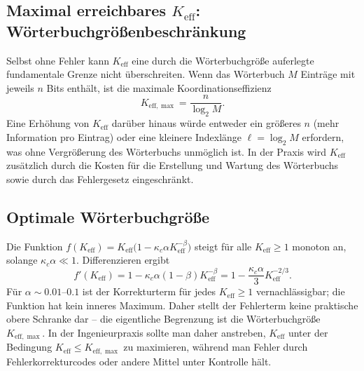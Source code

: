\documentclass[12pt,a4paper]{article}
\theoremstyle{remark}
\newcommand{\Keff}{K_{\mathrm{eff}}}
\newcommand{\Keffmax}{K_{\mathrm{eff},\max}}
\begin{document}
	\subsection{Maximal erreichbares $\Keff$: Wörterbuchgrößenbeschränkung}
	
	Selbst ohne Fehler kann $\Keff$ eine durch die Wörterbuchgröße auferlegte fundamentale Grenze nicht überschreiten. Wenn das Wörterbuch $M$ Einträge mit jeweils $n$ Bits enthält, ist die maximale Koordinationseffizienz
	\begin{equation}
		\Keffmax = \frac{n}{\log_2 M}. \label{eq:keff-max}
	\end{equation}
	Eine Erhöhung von $\Keff$ darüber hinaus würde entweder ein größeres $n$ (mehr Information pro Eintrag) oder eine kleinere Indexlänge $\ell = \log_2 M$ erfordern, was ohne Vergrößerung des Wörterbuchs unmöglich ist. In der Praxis wird $\Keff$ zusätzlich durch die Kosten für die Erstellung und Wartung des Wörterbuchs sowie durch das Fehlergesetz eingeschränkt.
	
	\subsection{Optimale Wörterbuchgröße}
	
	Die Funktion $f(\Keff) = \Keff \bigl(1 - \kappa_c \alpha K_{\mathrm{eff}}^{-\beta}\bigr)$ steigt für alle $\Keff \ge 1$ monoton an, solange $\kappa_c\alpha \ll 1$. Differenzieren ergibt
	\[
	f'(\Keff) = 1 - \kappa_c\alpha(1-\beta)K_{\mathrm{eff}}^{-\beta} = 1 - \frac{\kappa_c\alpha}{3} K_{\mathrm{eff}}^{-2/3}.
	\]
	Für $\alpha \sim 0.01$–$0.1$ ist der Korrekturterm für jedes $\Keff \ge 1$ vernachlässigbar; die Funktion hat kein inneres Maximum. Daher stellt der Fehlerterm keine praktische obere Schranke dar – die eigentliche Begrenzung ist die Wörterbuchgröße $\Keffmax$. In der Ingenieurpraxis sollte man daher anstreben, $\Keff$ unter der Bedingung $\Keff \le \Keffmax$ zu maximieren, während man Fehler durch Fehlerkorrekturcodes oder andere Mittel unter Kontrolle hält.
	
\end{document}
